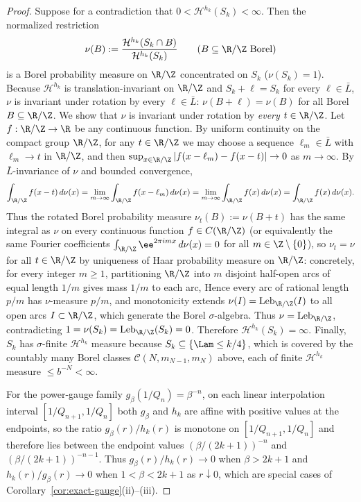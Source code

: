 \begin{proof}
Suppose for a contradiction that $0<\mathcal H^{h_k}(S_k)<\infty$. Then the
normalized restriction
\[
\nu(B):=\frac{\mathcal H^{h_k}(S_k\cap B)}{\mathcal H^{h_k}(S_k)}
\qquad(B\subseteq\R/\Z\text{ Borel})
\]
is a Borel probability measure on $\R/\Z$ concentrated on $S_k$ ($\nu(S_k)=1$).
Because $\mathcal H^{h_k}$ is translation-invariant on $\R/\Z$ and $S_k+\ell=S_k$
for every $\ell\in\bar L$, $\nu$ is invariant under rotation by every
$\ell\in\bar L$: $\nu(B+\ell)=\nu(B)$ for all Borel $B\subseteq\R/\Z$. We show
that $\nu$ is invariant under rotation by \emph{every} $t\in\R/\Z$. Let
$f:\R/\Z\to\R$ be any continuous function. By uniform continuity on the compact
group $\R/\Z$, for any $t\in\R/\Z$ we may choose a sequence $\ell_m\in\bar L$
with $\ell_m\to t$ in $\R/\Z$, and then
$\sup_{x\in\R/\Z}|f(x-\ell_m)-f(x-t)|\to0$ as $m\to\infty$. By $\bar L$-invariance
of $\nu$ and bounded convergence,
\[
\int_{\R/\Z}f(x-t)\,d\nu(x)
=\lim_{m\to\infty}\int_{\R/\Z}f(x-\ell_m)\,d\nu(x)
=\lim_{m\to\infty}\int_{\R/\Z}f(x)\,d\nu(x)
=\int_{\R/\Z}f(x)\,d\nu(x).
\]
Thus the rotated Borel probability measure $\nu_t(B):=\nu(B+t)$ has the same
integral as $\nu$ on every continuous function $f\in C(\R/\Z)$ (or equivalently
the same Fourier coefficients $\int_{\R/\Z}\ee^{2\pi i m x}\,d\nu(x)=0$ for all
$m\in\Z\setminus\{0\}$), so $\nu_t=\nu$ for all $t\in\R/\Z$ by uniqueness of
Haar probability measure on $\R/\Z$: concretely, for every integer $m\ge1$,
partitioning $\R/\Z$ into $m$ disjoint half-open arcs of equal length $1/m$
gives mass $1/m$ to each arc, Hence every arc of rational length $p/m$ has
$\nu$-measure $p/m$, and monotonicity extends $\nu(I)=\operatorname{Leb}_{\R/\Z}(I)$
to all open arcs $I\subset\R/\Z$, which generate the Borel $\sigma$-algebra.
Thus $\nu=\operatorname{Leb}_{\R/\Z}$, contradicting
$1=\nu(S_k)=\operatorname{Leb}_{\R/\Z}(S_k)=0$. Therefore
$\mathcal H^{h_k}(S_k)=\infty$. Finally, $S_k$ has $\sigma$-finite
$\mathcal H^{h_k}$ measure because $S_k\subseteq\{\Lam\le k/4\}$, which is
covered by the countably many Borel classes $\mathcal C(N,m_{N-1},m_N)$ above,
each of finite $\mathcal H^{h_k}$ measure $\le b^{-N}<\infty$.

For the power-gauge family $g_\beta(1/Q_n)=\beta^{-n}$, on each linear
interpolation interval $[1/Q_{n+1},1/Q_n]$ both $g_\beta$ and $h_k$ are affine
with positive values at the endpoints, so the ratio $g_\beta(r)/h_k(r)$ is
monotone on $[1/Q_{n+1},1/Q_n]$ and therefore lies between the endpoint values
$(\beta/(2k+1))^{-n}$ and $(\beta/(2k+1))^{-n-1}$. Thus
$g_\beta(r)/h_k(r)\to0$ when $\beta>2k+1$ and $h_k(r)/g_\beta(r)\to0$ when
$1<\beta<2k+1$ as $r\downarrow0$, which are special cases of
Corollary~\ref{cor:exact-gauge}(ii)--(iii).


\end{proof}
